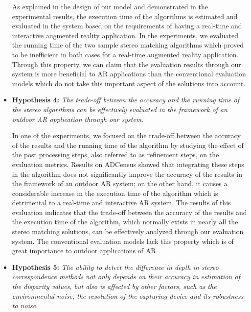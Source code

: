\begin{itemize}
As explained in the design of our model and demonstrated in the experimental results, the execution time of the algorithms 
is estimated and evaluated in the system based on the requirements of having a real-time and interactive augmented reality application.
In the experiments, we evaluated the running time of the two sample stereo matching algorithms which proved to be inefficient in both cases for 
a real-time augmented reality application. Through this property, we can claim that the evaluation results through our system is more beneficial to AR applications
than the conventional evaluation models which do not take this important aspect of the solutions into account.

\item \textbf{Hypothesis 4:} \emph{The trade-off between the accuracy and the running time of the stereo algorithms can be effectively evaluated 
in the framework of an outdoor AR application through our system.} 

In one of the experiments, we focused on the trade-off between the accuracy of the results and the running time of the algorithm by studying the effect
of the post processing steps, also referred to as refinement steps, on the evaluation metrics. Results on ADCensus showed that integrating these steps in the algorithm
does not significantly improve the accuracy of the results in the framework of an outdoor AR system; on the other hand, it causes a considerable increase in the execution
time of the algorithm which is detrimental to a real-time and interactive AR system. The results of this evaluation indicates that the trade-off between the accuracy 
of the results and the execution time of the algorithm, which normally exists in nearly all the stereo matching solutions, can be effectively analyzed 
through our evaluation system. The conventional evaluation models lack this property which is of great importance to outdoor applications of AR.

\item \textbf{Hypothesis 5:} \emph{The ability to detect the difference in depth in stereo correspondence methods not only depends on their accuracy
in estimation of the disparity values, but also is affected by other factors, such as the environmental noise, the resolution of the capturing device and its
robustness to noise.}


\end{itemize}
